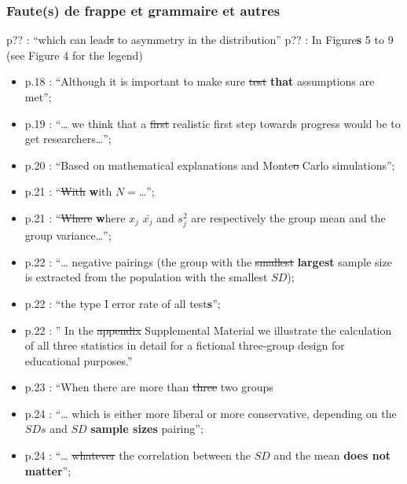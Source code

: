 \begin{appendix}
{\subsubsection{Faute(s) de frappe et grammaire et
autres}\label{fautes-de-frappe-et-grammaire-et-autres}}

p?? : ``which can lead\sout{s} to asymmetry in the distribution'' p?? :
In Figure\textbf{s} 5 to 9 (see Figure 4 for the legend)

\begin{itemize}
\tightlist
\item
  p.18 : ``Although it is important to make sure \sout{test}
  \textbf{that} assumptions are met'';\\
\item
  p.19 : ``\ldots{} we think that a \sout{first} realistic first step
  towards progress would be to get researchers\ldots{}'';\\
\item
  p.20 : ``Based on mathematical explanations and Monte\sout{o} Carlo
  simulations'';\\
\item
  p.21 : ``\sout{With} \textbf{w}ith \(N=\)\ldots{}'';\\
\item
  p.21 : ``\sout{Where} \textbf{w}here \sout{\(x_j\)} \(\bar{x_j}\) and
  \(s^2_j\) are respectively the group mean and the group
  variance\ldots{}'';\\
\item
  p.22 : ``\ldots{} negative pairings (the group with the
  \sout{smallest} \textbf{largest} sample size is extracted from the
  population with the smallest \(SD\));\\
\item
  p.22 : ``the type I error rate of all test\textbf{s}'';
\item
  p.22 : '' In the \sout{appendix} Supplemental Material we illustrate
  the calculation of all three statistics in detail for a fictional
  three-group design for educational purposes.''
\item
  p.23 : ``When there are more than \sout{three} \color{blue}two
  \color{black}groups
\item
  p.24 : ``\ldots{} which is either more liberal or more conservative,
  depending on the \(SDs\) and \sout{\(SD\)} \textbf{sample sizes}
  pairing'';\\
\item
  p.24 : ``\ldots{} \sout{whatever} the correlation between the \(SD\)
  and the mean \textbf{does not matter}'';
\end{itemize}
\end{appendix}
